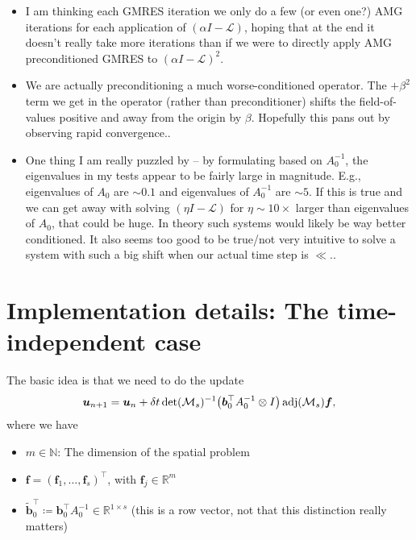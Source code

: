 \documentclass[review]{siamart}
\newcommand{\mdet}{\operatorname{det}}
\newcommand{\madj}{\operatorname{adj}}
\begin{document}
{\color{blue}
\begin{itemize}
	\item I am thinking each GMRES iteration we only do a few (or even one?) AMG iterations
	for each application of $(\alpha I - \mathcal{L})$, hoping that at the end it doesn't
	really take more iterations than if we were to directly apply AMG preconditioned GMRES
	to $(\alpha I - \mathcal{L})^2$.

	\item We are actually preconditioning a much worse-conditioned operator. The $+\beta^2$
	term we get in the operator (rather than preconditioner) shifts the field-of-values 
	positive and away from the origin by $\beta$. Hopefully this pans out by observing
	rapid convergence..

	\item One thing I am really puzzled by -- by formulating based on $A_0^{-1}$, the
	eigenvalues in my tests appear to be fairly large in magnitude. E.g., eigenvalues of
	$A_0$ are $\sim 0.1$ and eigenvalues of $A_0^{-1}$ are $\sim 5$. If this is true and we
	can get away with solving $(\eta I -\mathcal{L})$ for $\eta \sim 10\times$ larger than
	eigenvalues of $A_0$, that could be huge. In theory such systems would likely be way
	better conditioned. It also seems too good to be true/not very intuitive to solve a
	system with such a big shift when our actual time step is $\ll$..

\end{itemize}
}



\section{Implementation details:  The time-independent case}
The basic idea is that we need to do the update
\begin{align} \label{eq:RK_update}
\bm{u}_{n+1}  = \bm{u}_n + \delta t \mdet({\cal M}_s)^{-1} \big( \bm{b}_0^\top A^{-1}_0 \otimes I \big) \madj({\cal M}_s) \bm{f},
\end{align}
where we have
\begin{itemize}
\item $m \in \mathbb{N}$: The dimension of the spatial problem

\item $\bm{f} = (\bm{f}_1, \ldots, \bm{f}_s)^\top$, with $\bm{f}_j \in \mathbb{R}^m$

\item $\tilde{\bm{b}}^\top_0 \coloneqq \bm{b}^\top_0 A^{-1}_0 \in \mathbb{R}^{1 \times s}$ (this is a row vector, not that this distinction really matters) 
\end{itemize}
\end{document}
